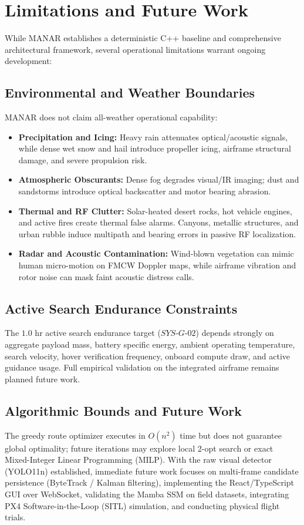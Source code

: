 \section{Limitations and Future Work}

While MANAR establishes a deterministic C++ baseline and comprehensive architectural framework, several operational limitations warrant ongoing development:

\subsection{Environmental and Weather Boundaries}
MANAR does not claim all-weather operational capability:
\begin{itemize}
    \item \textbf{Precipitation and Icing:} Heavy rain attenuates optical/acoustic signals, while dense wet snow and hail introduce propeller icing, airframe structural damage, and severe propulsion risk.
    \item \textbf{Atmospheric Obscurants:} Dense fog degrades visual/IR imaging; dust and sandstorms introduce optical backscatter and motor bearing abrasion.
    \item \textbf{Thermal and RF Clutter:} Solar-heated desert rocks, hot vehicle engines, and active fires create thermal false alarms. Canyons, metallic structures, and urban rubble induce multipath and bearing errors in passive RF localization.
    \item \textbf{Radar and Acoustic Contamination:} Wind-blown vegetation can mimic human micro-motion on FMCW Doppler maps, while airframe vibration and rotor noise can mask faint acoustic distress calls.
\end{itemize}

\subsection{Active Search Endurance Constraints}
The $1.0\text{ hr}$ active search endurance target ($SYS\text{-}G\text{-}02$) depends strongly on aggregate payload mass, battery specific energy, ambient operating temperature, search velocity, hover verification frequency, onboard compute draw, and active guidance usage. Full empirical validation on the integrated airframe remains planned future work.

\subsection{Algorithmic Bounds and Future Work}
The greedy route optimizer executes in $O(n^2)$ time but does not guarantee global optimality; future iterations may explore local 2-opt search or exact Mixed-Integer Linear Programming (MILP). With the raw visual detector (YOLO11n) established, immediate future work focuses on multi-frame candidate persistence (ByteTrack / Kalman filtering), implementing the React/TypeScript GUI over WebSocket, validating the Mamba SSM on field datasets, integrating PX4 Software-in-the-Loop (SITL) simulation, and conducting physical flight trials.
